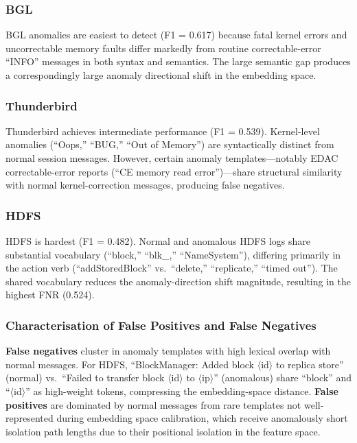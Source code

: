 \documentclass[conference]{IEEEtran}
\begin{document}
\subsubsection{BGL}
BGL anomalies are easiest to detect (F1 = 0.617) because fatal kernel
errors and uncorrectable memory faults differ markedly from routine
correctable-error ``INFO'' messages in both syntax and semantics.  The large
semantic gap produces a correspondingly large anomaly directional shift in the
embedding space.

\subsubsection{Thunderbird}
Thunderbird achieves intermediate performance (F1 = 0.539).  Kernel-level
anomalies (``Oops,'' ``BUG,'' ``Out of Memory'') are syntactically distinct
from normal session messages.  However, certain anomaly templates---notably
EDAC correctable-error reports (``CE memory read error'')---share structural
similarity with normal kernel-correction messages, producing false negatives.

\subsubsection{HDFS}
HDFS is hardest (F1 = 0.482).  Normal and anomalous HDFS logs share
substantial vocabulary (``block,'' ``blk\_,'' ``NameSystem''), differing
primarily in the action verb (``addStoredBlock'' vs.\ ``delete,''
``replicate,'' ``timed out'').  The shared vocabulary reduces the
anomaly-direction shift magnitude, resulting in the highest FNR (0.524).

\subsubsection{Characterisation of False Positives and False Negatives}
\textbf{False negatives} cluster in anomaly templates with high lexical
overlap with normal messages.  For HDFS, ``BlockManager: Added block
$\langle$id$\rangle$ to replica store'' (normal) vs.\ ``Failed to transfer
block $\langle$id$\rangle$ to $\langle$ip$\rangle$'' (anomalous) share
``block'' and ``$\langle$id$\rangle$'' as high-weight tokens, compressing
the embedding-space distance.  \textbf{False positives} are dominated by
normal messages from rare templates not well-represented during embedding
space calibration, which receive anomalously short isolation path lengths
due to their positional isolation in the feature space.
\end{document}
